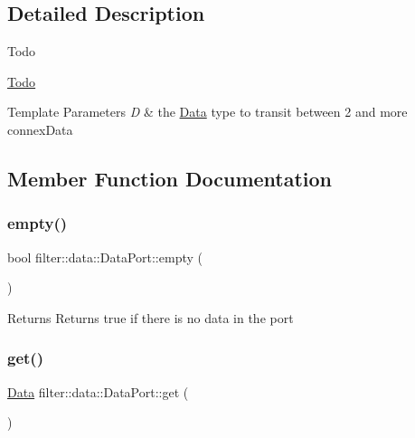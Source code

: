 \subsection{Detailed Description}
\begin{DoxyRefDesc}{Todo}
\item[\hyperlink{todo__todo000019}{Todo}]\end{DoxyRefDesc}

\begin{DoxyTemplParams}{Template Parameters}
{\em D} & the \hyperlink{classfilter_1_1data_1_1_data}{Data} type to transit between 2 and more connex\+Data \\
\hline
\end{DoxyTemplParams}


\subsection{Member Function Documentation}
\mbox{\label{classfilter_1_1data_1_1_data_port_ad06844afc36ff14f5d254a2f6ebf748a}} 
\subsubsection{\texorpdfstring{empty()}{empty()}}
{\footnotesize\ttfamily bool filter\+::data\+::\+Data\+Port\+::empty (\begin{DoxyParamCaption}{ }\end{DoxyParamCaption})\hspace{0.3cm}{\ttfamily [inline]}}

\begin{DoxyReturn}{Returns}
Returns true if there is no data in the port 
\end{DoxyReturn}
\mbox{\label{classfilter_1_1data_1_1_data_port_aab5c7164e7da8e31c92221ccbbcdfc82}} 
\subsubsection{\texorpdfstring{get()}{get()}}
{\footnotesize\ttfamily \hyperlink{classfilter_1_1data_1_1_data}{Data} filter\+::data\+::\+Data\+Port\+::get (\begin{DoxyParamCaption}{ }\end{DoxyParamCaption})\hspace{0.3cm}{\ttfamily [inline]}}

